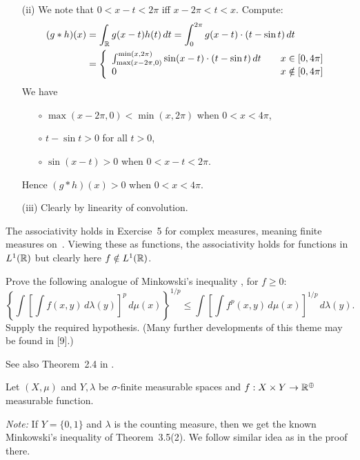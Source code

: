 \begin{enumerate}
\begin{itemize}
\item[(ii)]
We note that \(0 < x-t < 2\pi\) iff  \(x-2\pi < t < x\).
Compute:
\begin{align*}
(g\ast h)(x)
&= \int_{\mathbb{R}} g(x-t)h(t)\,dt
 = \int_0^{2\pi} g(x-t)\cdot (t - \sin t)\,dt
 \\
&= \left\{\begin{array}{ll}
   \int_{\max(x-2\pi,0)}^{\min(x,2\pi)} \sin (x-t)\cdot (t - \sin t)\,dt 
        \quad & x \in [0,4\pi] \\
   0  & x \notin [0,4\pi]
   \end{array}\right.
\end{align*}
We have 
\begin{itemize}
\item[\(\circ\)] \(\max(x-2\pi,0) < \min(x,2\pi)\) when \(0<x<4\pi\),
\item[\(\circ\)] \(t-\sin t > 0\) for all \(t>0\),
\item[\(\circ\)] \(\sin(x-t)>0\) when \(0 < x-t < 2\pi\).
\end{itemize}
Hence \((g\ast h)(x)>0\) when \(0<x<4\pi\).

\item[(iii)]
Clearly by linearity of convolution.

\end{itemize}
The associativity holds in Exercise~5 for complex measures, 
meaning finite measures on~\R. Viewing these as functions, 
the associativity holds for functions in \(L^1(\mathbb{R})\) but clearly
here \(f\notin L^1(\mathbb{R})\).

\begin{excopy}
Prove the following analogue of Minkowski's inequality
, for \(f\geq 0\):
\begin{equation*}
\left\{\int \left[\int f(x,y)\,d\lambda(y)\right]^p\,d\mu(x)\right\}^{1/p}
\leq
\int \left[\int f^p(x,y)\,d\mu(x) \right]^{1/p}\,d\lambda(y).
\end{equation*}
Supply the required hypothesis.
(Many further developments of this theme may be found in [9].)
\end{excopy}

See also Theorem~2.4 in \cite{LiebLoss200104}.

Let \((X,\mu)\) and \(Y,\lambda\) be \(\sigma\)-finite measurable spaces
and \(f:X\times Y\to  \mathbb{R}^\oplus\) measurable function.

\emph{Note:} If \(Y = \{0,1\}\) and \(\lambda\) is the counting measure,
then we get the known Minkowski's inequality
of Theorem~3.5(2). We follow similar idea as in the proof there.


\end{enumerate}
